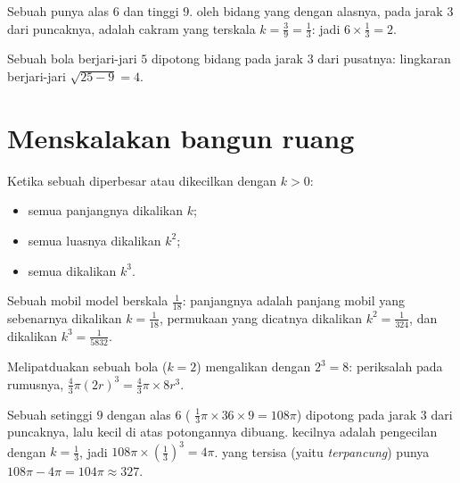 \begin{example}\label{ex:g9:solids:section}
Sebuah  punya  alas $6$ dan tinggi $9$.  oleh
bidang yang  dengan alasnya, pada jarak $3$ dari puncaknya,
adalah cakram yang terskala $k = \frac39 = \frac13$: jadi 
$6 \times \frac13 = 2$.

Sebuah bola berjari-jari $5$ dipotong bidang pada jarak $3$ dari
pusatnya:  lingkaran berjari-jari $\sqrt{25 - 9} = 4$.
\end{example}

\section{Menskalakan bangun ruang}

\begin{theorem}\label{thm:g9:solids:scaling}
Ketika sebuah  diperbesar atau dikecilkan dengan  $k > 0$:
\begin{itemize}
  \item semua panjangnya dikalikan $k$;
  \item semua luasnya dikalikan $k^2$;
  \item semua  dikalikan $k^3$.
\end{itemize}
\end{theorem}
\admitted

\begin{example}\label{ex:g9:solids:scaling}
Sebuah mobil model berskala $\frac{1}{18}$: panjangnya adalah panjang
mobil yang sebenarnya dikalikan $k = \frac{1}{18}$, permukaan yang
dicatnya dikalikan $k^2 = \frac{1}{324}$, dan  dikalikan
$k^3 = \frac{1}{5832}$.

Melipatduakan  sebuah bola ($k = 2$) mengalikan 
dengan $2^3 = 8$: periksalah pada rumusnya,
$\frac43\pi (2r)^3 = \frac43 \pi \times 8r^3$.
\end{example}

\begin{example}\label{ex:g9:solids:truncated}
Sebuah  setinggi $9$ dengan  alas $6$ (
$\frac13 \pi \times 36 \times 9 = 108\pi$) dipotong pada jarak $3$ dari
puncaknya, lalu  kecil di atas potongannya dibuang. 
kecilnya adalah pengecilan dengan $k = \frac13$, jadi 
$108\pi \times \left(\frac13\right)^3 = 4\pi$.  yang
tersisa (yaitu \emph{ terpancung}) punya 
$108\pi - 4\pi = 104\pi \approx 327$.
\end{example}

